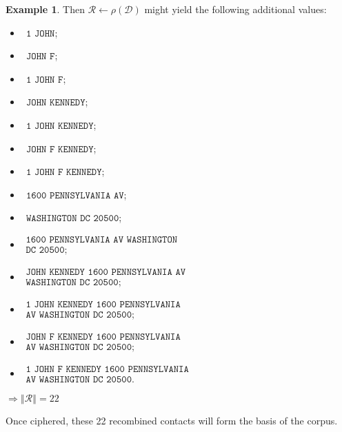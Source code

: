 \documentclass[twoside,twocolumn]{article}
\newcommand{\norm}[1]{\left\Vert#1\right\Vert}
\theoremstyle{definition}
\newtheorem{example}{Example}
\theoremstyle{remark}
\begin{document}
\begin{example}
    Then $\mathcal{R} \gets \rho(\mathcal{D})$ might yield the following additional values:
    \begin{small} \begin{itemize}
        \item $~~\texttt{1 JOHN}$;
        \item $~~\texttt{JOHN F}$;
        \item $~~\texttt{1 JOHN F}$;
        \item $~~\texttt{JOHN KENNEDY}$;
        \item $~~\texttt{1 JOHN KENNEDY}$;
        \item $~~\texttt{JOHN F KENNEDY}$;
        \item $~~\texttt{1 JOHN F KENNEDY}$;
        \item $~~\texttt{1600 PENNSYLVANIA AV}$;
        \item $~~\texttt{WASHINGTON DC 20500}$;
        \item $\begin{array}{l} \texttt{1600 PENNSYLVANIA AV WASHINGTON} \\ \texttt{DC 20500}; \end{array}$
        \item $\begin{array}{l} \texttt{JOHN KENNEDY 1600 PENNSYLVANIA AV} \\\texttt{WASHINGTON DC 20500}; \end{array}$
        \item $\begin{array}{l} \texttt{1 JOHN KENNEDY 1600 PENNSYLVANIA} \\ \texttt{AV WASHINGTON DC 20500}; \end{array}$
        \item $\begin{array}{l} \texttt{JOHN F KENNEDY 1600 PENNSYLVANIA} \\ \texttt{AV WASHINGTON DC 20500}; \end{array}$
        \item $\begin{array}{l} \texttt{1 JOHN F KENNEDY 1600 PENNSYLVANIA} \\ \texttt{AV WASHINGTON DC 20500}. \end{array}$
    \end{itemize} \end{small}
    $\Longrightarrow \norm{\mathcal{R}} = 22$

    Once ciphered, these 22 recombined contacts will form the basis of the corpus.
\end{example}
\end{document}
